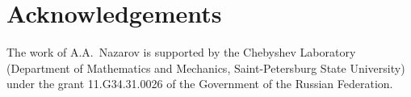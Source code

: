 \documentclass[12pt]{article}
\begin{document}
\section*{Acknowledgements}
\label{sec:acknowledgements}

The work of A.A.~Nazarov is supported by the Chebyshev Laboratory
(Department of Mathematics and Mechanics, Saint-Petersburg State
University) under the grant 11.G34.31.0026 of the Government of the
Russian Federation.

{}


\end{document}
